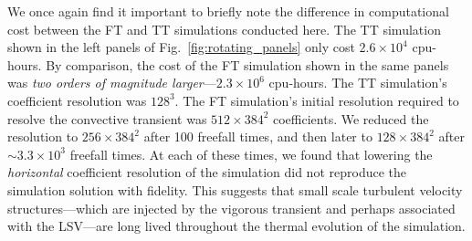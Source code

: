\documentclass[aps, pre, onecolumn, nofootinbib, notitlepage, groupedaddress, amsfonts, amssymb, amsmath, longbibliography, superscriptaddress]{revtex4-1}
\begin{document}
We once again find it important to briefly note the difference in computational cost between the FT and TT simulations conducted here.
The TT simulation shown in the left panels of Fig.~\ref{fig:rotating_panels} only cost $2.6 \times 10^4$ cpu-hours.
By comparison, the cost of the FT simulation shown in the same panels was \emph{two orders of magnitude larger}---$2.3 \times 10^6$ cpu-hours.
The TT simulation's coefficient resolution was $128^3$.
The FT simulation's initial resolution required to resolve the convective transient was $512\times384^2$ coefficients.
We reduced the resolution to $256\times384^2$ after 100 freefall times, and then later to $128\times384^2$ after $\sim3.3 \times 10^3$ freefall times.
At each of these times, we found that lowering the \emph{horizontal} coefficient resolution of the simulation did not reproduce the simulation solution with fidelity.
This suggests that small scale turbulent velocity structures---which are injected by the vigorous transient and perhaps associated with the LSV---are long lived throughout the thermal evolution of the simulation.
\end{document}
